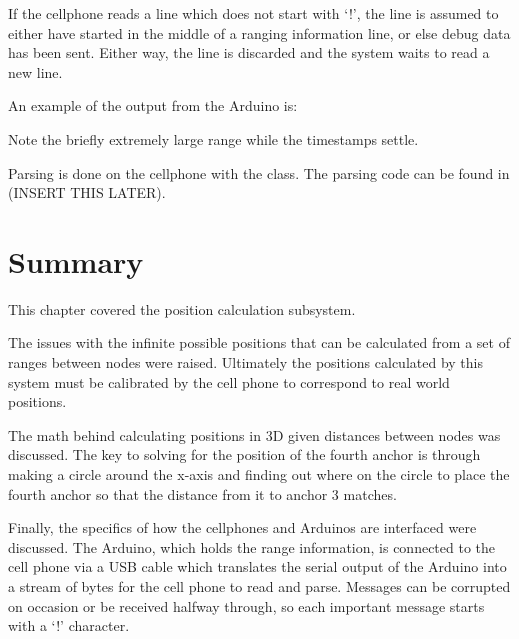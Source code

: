 \begin{center}
\end{center}


If the cellphone reads a line which does not start with `!', the line is assumed to either have started in the middle of a ranging information line, or else debug data has been sent. Either way, the line is discarded and the system waits to read a new line.

An example of the output from the Arduino is:


Note the briefly extremely large range while the timestamps settle.

Parsing is done on the cellphone with the  class. The parsing code can be found in (INSERT THIS LATER).

\section{Summary}
This chapter covered the position calculation subsystem.

The issues with the infinite possible positions that can be calculated from a set of ranges between nodes were raised. Ultimately the positions calculated by this system must be calibrated by the cell phone to correspond to real world positions.

The math behind calculating positions in 3D given distances between nodes was discussed. The key to solving for the position of the fourth anchor is through making a circle around the x-axis and finding out where on the circle to place the fourth anchor so that the distance from it to anchor 3 matches.

Finally, the specifics of how the cellphones and Arduinos are interfaced were discussed. The Arduino, which holds the range information, is connected to the cell phone via a USB cable which translates the serial output of the Arduino into a stream of bytes for the cell phone to read and parse. Messages can be corrupted on occasion or be received halfway through, so each important message starts with a `!' character.